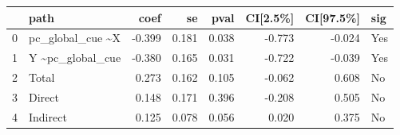 \begin{tabular}{llrrrrrl}
\toprule
{} &               path &   coef &     se &   pval &  CI[2.5\%] &  CI[97.5\%] &  sig \\
\midrule
0 &  pc\_global\_cue \textasciitilde  X & -0.399 &  0.181 &  0.038 &    -0.773 &     -0.024 &  Yes \\
1 &  Y \textasciitilde  pc\_global\_cue & -0.380 &  0.165 &  0.031 &    -0.722 &     -0.039 &  Yes \\
2 &              Total &  0.273 &  0.162 &  0.105 &    -0.062 &      0.608 &   No \\
3 &             Direct &  0.148 &  0.171 &  0.396 &    -0.208 &      0.505 &   No \\
4 &           Indirect &  0.125 &  0.078 &  0.056 &     0.020 &      0.375 &   No \\
\bottomrule
\end{tabular}
